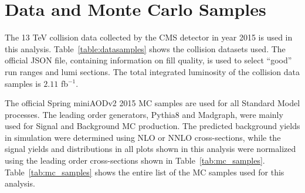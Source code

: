 \section{Data and Monte Carlo Samples}\label{sec:samples}


The 13 TeV collision data collected by the CMS detector in year 2015 is used in this analysis. Table~\ref{table:datasamples} shows the collision datasets used. 
 The official JSON file, containing information on fill quality, is used to select ``good'' run ranges and lumi sections. The total integrated luminosity of the collision data samples is $2.11$ fb$^{-1}$.

The official Spring miniAODv2 2015 MC samples are used for all Standard Model processes. The leading order generators, {\sc Pythia8} and {\sc Madgraph}, were 
mainly used for Signal and Background MC production. The predicted background yields in simulation were determined using NLO or NNLO cross-sections, while the 
signal yields and distributions in all plots shown in this analysis were normalized using the leading order cross-sections shown in Table~\ref{tab:mc_samples}. 
Table~\ref{tab:mc_samples} shows the entire list of the MC samples used for this analysis. 

